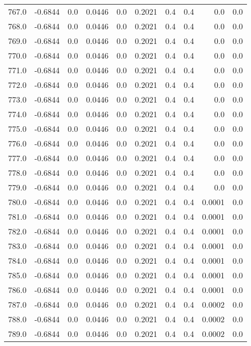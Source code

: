 \begin{longtable}{lrrrrrrrrr}
767.0 & -0.6844 & 0.0 & 0.0446 & 0.0 & 0.2021 & 0.4 & 0.4 & 0.0 & 0.0 \\
768.0 & -0.6844 & 0.0 & 0.0446 & 0.0 & 0.2021 & 0.4 & 0.4 & 0.0 & 0.0 \\
769.0 & -0.6844 & 0.0 & 0.0446 & 0.0 & 0.2021 & 0.4 & 0.4 & 0.0 & 0.0 \\
770.0 & -0.6844 & 0.0 & 0.0446 & 0.0 & 0.2021 & 0.4 & 0.4 & 0.0 & 0.0 \\
771.0 & -0.6844 & 0.0 & 0.0446 & 0.0 & 0.2021 & 0.4 & 0.4 & 0.0 & 0.0 \\
772.0 & -0.6844 & 0.0 & 0.0446 & 0.0 & 0.2021 & 0.4 & 0.4 & 0.0 & 0.0 \\
773.0 & -0.6844 & 0.0 & 0.0446 & 0.0 & 0.2021 & 0.4 & 0.4 & 0.0 & 0.0 \\
774.0 & -0.6844 & 0.0 & 0.0446 & 0.0 & 0.2021 & 0.4 & 0.4 & 0.0 & 0.0 \\
775.0 & -0.6844 & 0.0 & 0.0446 & 0.0 & 0.2021 & 0.4 & 0.4 & 0.0 & 0.0 \\
776.0 & -0.6844 & 0.0 & 0.0446 & 0.0 & 0.2021 & 0.4 & 0.4 & 0.0 & 0.0 \\
777.0 & -0.6844 & 0.0 & 0.0446 & 0.0 & 0.2021 & 0.4 & 0.4 & 0.0 & 0.0 \\
778.0 & -0.6844 & 0.0 & 0.0446 & 0.0 & 0.2021 & 0.4 & 0.4 & 0.0 & 0.0 \\
779.0 & -0.6844 & 0.0 & 0.0446 & 0.0 & 0.2021 & 0.4 & 0.4 & 0.0 & 0.0 \\
780.0 & -0.6844 & 0.0 & 0.0446 & 0.0 & 0.2021 & 0.4 & 0.4 & 0.0001 & 0.0 \\
781.0 & -0.6844 & 0.0 & 0.0446 & 0.0 & 0.2021 & 0.4 & 0.4 & 0.0001 & 0.0 \\
782.0 & -0.6844 & 0.0 & 0.0446 & 0.0 & 0.2021 & 0.4 & 0.4 & 0.0001 & 0.0 \\
783.0 & -0.6844 & 0.0 & 0.0446 & 0.0 & 0.2021 & 0.4 & 0.4 & 0.0001 & 0.0 \\
784.0 & -0.6844 & 0.0 & 0.0446 & 0.0 & 0.2021 & 0.4 & 0.4 & 0.0001 & 0.0 \\
785.0 & -0.6844 & 0.0 & 0.0446 & 0.0 & 0.2021 & 0.4 & 0.4 & 0.0001 & 0.0 \\
786.0 & -0.6844 & 0.0 & 0.0446 & 0.0 & 0.2021 & 0.4 & 0.4 & 0.0001 & 0.0 \\
787.0 & -0.6844 & 0.0 & 0.0446 & 0.0 & 0.2021 & 0.4 & 0.4 & 0.0002 & 0.0 \\
788.0 & -0.6844 & 0.0 & 0.0446 & 0.0 & 0.2021 & 0.4 & 0.4 & 0.0002 & 0.0 \\
789.0 & -0.6844 & 0.0 & 0.0446 & 0.0 & 0.2021 & 0.4 & 0.4 & 0.0002 & 0.0 \\

\end{longtable}
